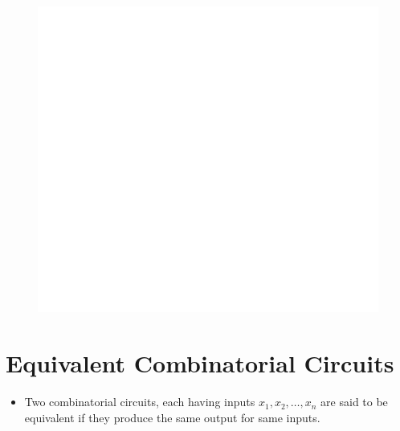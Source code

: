 \documentclass[]{book}
\providecommand{\tightlist}{%
  \setlength{\itemsep}{0pt}\setlength{\parskip}{0pt}}
\begin{document}
\begin{figure}

{\centering \includegraphics[width=1\linewidth]{figure/boxC410-1} 

}

\end{figure}

\hypertarget{equivalent-combinatorial-circuits}{%
\section{Equivalent Combinatorial Circuits}\label{equivalent-combinatorial-circuits}}

\begin{itemize}
\tightlist
\item
  Two combinatorial circuits, each having inputs \(x_1, x_2, \dots, x_n\) are said to be equivalent if they produce the same output for same inputs.
\end{itemize}
\end{document}
